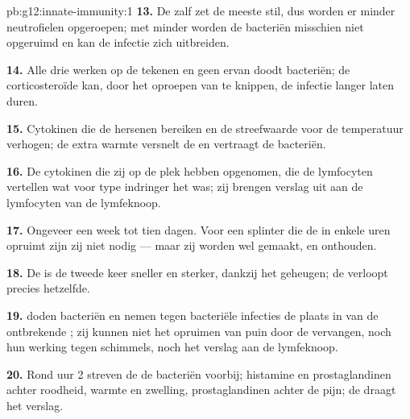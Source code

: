 \begin{solution}{pb:g12:innate-immunity:1}
\textbf{13.} De zalf zet de meeste  stil, dus worden er minder
neutrofielen opgeroepen; met minder  worden de bacteriën
misschien niet opgeruimd en kan de infectie zich uitbreiden.

\textbf{14.} Alle drie werken op de tekenen en geen ervan doodt bacteriën;
de corticosteroïde kan, door het oproepen van  te knippen, de
infectie langer laten duren.

\textbf{15.} Cytokinen die de hersenen bereiken en de streefwaarde voor de
temperatuur verhogen; de extra warmte versnelt de  en vertraagt
de bacteriën.

\textbf{16.} De cytokinen die zij op de plek hebben opgenomen, die de
lymfocyten vertellen wat voor type indringer het was; zij brengen verslag
uit aan de lymfocyten van de lymfeknoop.

\textbf{17.} Ongeveer een week tot tien dagen. Voor een splinter die de
 in enkele uren opruimt zijn zij niet nodig --- maar zij
worden wel gemaakt, en onthouden.

\textbf{18.} De  is de tweede keer sneller en sterker,
dankzij het geheugen; de  verloopt precies hetzelfde.

\textbf{19.}  doden bacteriën en nemen tegen bacteriële
infecties de plaats in van de ontbrekende ; zij kunnen niet het
opruimen van puin door de  vervangen, noch hun werking tegen
schimmels, noch het verslag aan de lymfeknoop.

\textbf{20.} Rond uur 2 streven de  de bacteriën voorbij;
histamine en prostaglandinen achter roodheid, warmte en zwelling,
prostaglandinen achter de pijn; de  draagt het verslag.
\end{solution}
